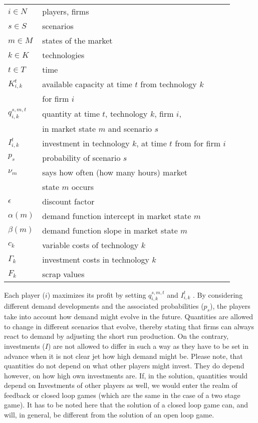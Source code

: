 \begin{tabular}[c]{l l}
$i\in N$        & players, firms\\
$s\in S$       	& scenarios\\
$m\in M$	& states of the market \\
$k\in K$	& technologies \\
$t\in T$	& time \\
$K_{i,k}^t$      & available capacity at time $t$ from technology $k$ \\
                & for firm $i$ \\
$q_{i,k}^{s,m,t}$ & quantity at time $t$, technology $k$, firm $i$, \\
                & in market state $m$ and scenario $s$ \\			
$I_{i,k}^t$   & investment in technology $k$, at time $t$ from for firm $i$\\
$p_s$        & probability of scenario $s$\\
$\nu_m$      & says how often (how many hours) market \\
             & state $m$ occurs \\
$\epsilon$   & discount factor \\
$\alpha(m)$  & demand function intercept in market state $m$ \\
$\beta(m)$   & demand function slope in market state $m$ \\
$c_k$	     & variable costs of technology $k$	\\
$\Gamma_k$   & investment costs in technology $k$  \\
$F_k$        & scrap values  \\
\end{tabular}

Each player ($i$) maximizes its profit by setting $q_{i,k}^{s,m,t}$ and $I_{i,k}^t$ . By considering different demand developments and the associated probabilities ($p_s$), the players take into account how demand might evolve in the future. Quantities are allowed to change in different scenarios that evolve, thereby stating that firms can always react to demand by adjusting the short run production. On the contrary, investments ($I$) are not allowed to differ in such a way as they have to be set in advance when it is not clear jet how high demand might be. Please note, that quantities do not depend on what other players might invest. They do depend however, on how high own investments are.
If, in the solution, quantities would depend on Investments of other players as well, we would enter the realm of feedback or closed loop games (which are the same in the case of a two stage game). It has to be noted here that the solution of a closed loop game can, and will, in general, be different from the solution of an open loop game.

